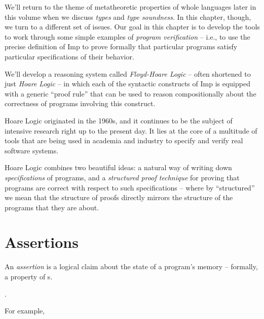 \documentclass[12pt]{report}
\begin{document}
    We'll return to the theme of metatheoretic properties of whole
    languages later in this volume when we discuss \textit{types} and \textit{type
    soundness}.  In this chapter, though, we turn to a different set
    of issues.
 Our goal in this chapter is to develop the tools to work through
    some simple examples of \textit{program verification} -- i.e., to use the
    precise definition of Imp to prove formally that particular
    programs satisfy particular specifications of their behavior.


    We'll develop a reasoning system called \textit{Floyd-Hoare Logic} --
    often shortened to just \textit{Hoare Logic} -- in which each of the
    syntactic constructs of Imp is equipped with a generic ``proof
    rule'' that can be used to reason compositionally about the
    correctness of programs involving this construct. 

 Hoare Logic originated in the 1960s, and it continues to be the
    subject of intensive research right up to the present day.  It
    lies at the core of a multitude of tools that are being used in
    academia and industry to specify and verify real software systems. 

 Hoare Logic combines two beautiful ideas: a natural way of writing
    down \textit{specifications} of programs, and a \textit{structured proof
    technique} for proving that programs are correct with respect to
    such specifications -- where by ``structured'' we mean that the
    structure of proofs directly mirrors the structure of the programs
    that they are about. 
\begin{coqdoccode}
\coqdocemptyline
\end{coqdoccode}
\section{Assertions}



 An \textit{assertion} is a logical claim about the state of a program's
    memory -- formally, a property of s. 
\begin{coqdoccode}
\coqdocemptyline
\coqdocnoindent
{}     .\coqdoceol
\coqdocemptyline
\end{coqdoccode}
For example,
\end{document}
